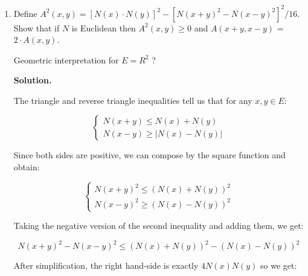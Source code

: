 \documentclass[12pt]{article}
\newenvironment{solution}{\vspace{0.2cm} \textbf{Solution.}}{}
\begin{document}
\begin{enumerate}[label=(\alph*)]
\begin{solution}
		However, \textbf{for} $p \geq 1$ \textbf{but} $p\neq 2$, $N_p$ is not Euclidean.
		As a counterexample, one can consider $x = (1,1,0, \ldots, 0)$ and $y = (1,-1,0,\ldots,0)$. We have $N_p(x) = N_p (y) = \sqrt[p]{2}$ but $N_p (x+y) = N_p (x-y) = 2$. So $N_p ^2 (x+y) + N_p ^2 (x-y) = 8 \neq 2 ( N_p ^2 (x) + N_p ^2 (y)) = 4 \sqrt[\frac{p}{2}]{2}$.
		
		Since it doesn't check the parallelogram identity, $N_p$ is not Euclidean \textbf{for} $p \geq 1$ \textbf{but} $p\neq 2$.
		
		$Q_p$ is not a norm for any $p \in [1, \infty)$ since it doesn't check the triangle inequality: for $x = (1,0,\ldots,0)$ and $y = (0,1,0,\ldots,0)$, we have:
		$$Q_p(x+y)^2 = 2^2 + \frac{1}{p} > Q_p(x)^2 + Q_p(y)^2 = 1^2 + 1^2 = 2$$
		
		A fortiori, it can't be a Euclidean norm.
		
		\end{solution}
		\item Define $A^2 (x, y) = [N(x) \cdot N(y)]^2 - [N(x + y)^2 - N(x - y)^2 ]^2 /16$. Show that if $N$ is Euclidean then
		$A^2 (x, y) \geq 0$ and $A(x + y, x - y)$ = $2 \cdot A(x, y)$.
		
		Geometric interpretation for $E = R^2$ ?
		
		\begin{solution}
		
		The triangle and reverse triangle inequalities tell us that for any $x,y \in E$:
		
		$$
		\left\{
		\begin{array}{ll}
		N(x+y) \leqslant N(x) + N(y)\\
		N(x-y) \geqslant | N(x) - N(y)|
		\end{array}
		\right.
		$$
		
		Since both sides are positive, we can compose by the square function and obtain:
		
		$$
		\left\{
		\begin{array}{ll}
		N(x+y)^2 \leqslant (N(x) + N(y))^2\\
		N(x-y)^2 \geqslant (N(x) - N(y))^2
		\end{array}
		\right.
		$$
		
		Taking the negative version of the second inequality and adding them, we get:
		
		$$
		N(x+y)^2 - N(x-y)^2 \leqslant (N(x) + N(y))^2 - (N(x) - N(y))^2
		$$
		
		After simplification, the right hand-side is exactly $4 N(x) N(y)$ so we get:
		

\end{solution}
\end{enumerate}
\end{document}
